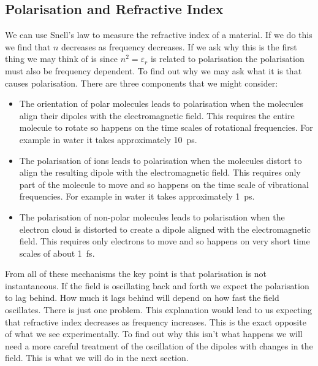     \subsection{Polarisation and Refractive Index}
    We can use Snell's law to measure the refractive index of a material.
    If we do this we find that \(n\) decreases as frequency decreases.
    If we ask why this is the first thing we may think of is since \(n^2 = \varepsilon_r\) is related to polarisation the polarisation must also be frequency dependent.
    To find out why we may ask what it is that causes polarisation.
    There are three components that we might consider:
    \begin{itemize}
        \item The orientation of polar molecules leads to polarisation when the molecules align their dipoles with the electromagnetic field.
        This requires the entire molecule to rotate so happens on the time scales of rotational frequencies.
        For example in water it takes approximately \SI{10}{\pico\second}.
        \item The polarisation of ions leads to polarisation when the molecules distort to align the resulting dipole with the electromagnetic field.
        This requires only part of the molecule to move and so happens on the time scale of vibrational frequencies.
        For example in water it takes approximately \SI{1}{\pico\second}.
        \item The polarisation of non-polar molecules leads to polarisation when the electron cloud is distorted to create a dipole aligned with the electromagnetic field.
        This requires only electrons to move and so happens on very short time scales of about \SI{1}{\femto\second}.
    \end{itemize}
    From all of these mechanisms the key point is that polarisation is not instantaneous.
    If the field is oscillating back and forth we expect the polarisation to lag behind.
    How much it lags behind will depend on how fast the field oscillates.
    There is just one problem.
    This explanation would lead to us expecting that refractive index decreases as frequency increases.
    This is the exact opposite of what we see experimentally.
    To find out why this isn't what happens we will need a more careful treatment of the oscillation of the dipoles with changes in the field.
    This is what we will do in the next section.
    
